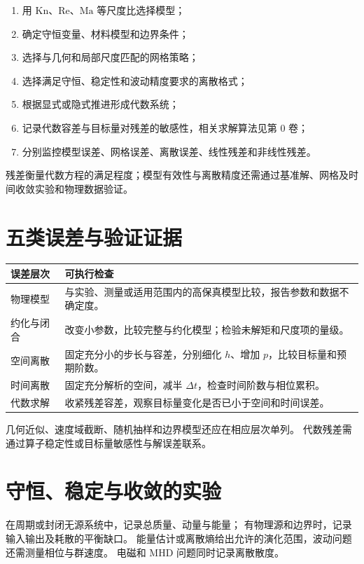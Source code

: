 \begin{enumerate}
  \item 用 \(\mathrm{Kn}\)、\(\mathrm{Re}\)、\(\mathrm{Ma}\) 等尺度比选择模型；
  \item 确定守恒变量、材料模型和边界条件；
  \item 选择与几何和局部尺度匹配的网格策略；
  \item 选择满足守恒、稳定性和波动精度要求的离散格式；
  \item 根据显式或隐式推进形成代数系统；
  \item 记录代数容差与目标量对残差的敏感性，相关求解算法见第 0 卷；
  \item 分别监控模型误差、网格误差、离散误差、线性残差和非线性残差。
\end{enumerate}

残差衡量代数方程的满足程度；模型有效性与离散精度还需通过基准解、网格及时间收敛实验和物理数据验证。

\section{五类误差与验证证据}
\begin{center}\small
\begin{tabularx}{\textwidth}{@{}l>{\raggedright\arraybackslash}X@{}}
\toprule
误差层次 & 可执行检查\\
\midrule
物理模型 & 与实验、测量或适用范围内的高保真模型比较，报告参数和数据不确定度。\\
约化与闭合 & 改变小参数，比较完整与约化模型；检验未解矩和尺度项的量级。\\
空间离散 & 固定充分小的步长与容差，分别细化 $h$、增加 $p$，比较目标量和预期阶数。\\
时间离散 & 固定充分解析的空间，减半 $\Delta t$，检查时间阶数与相位累积。\\
代数求解 & 收紧残差容差，观察目标量变化是否已小于空间和时间误差。\\
\bottomrule
\end{tabularx}
\end{center}
几何近似、速度域截断、随机抽样和边界模型还应在相应层次单列。
代数残差需通过算子稳定性或目标量敏感性与解误差联系。

\section{守恒、稳定与收敛的实验}
在周期或封闭无源系统中，记录总质量、动量与能量；
有物理源和边界时，记录输入输出及耗散的平衡缺口。
能量估计或离散熵给出允许的演化范围，波动问题还需测量相位与群速度。
电磁和 MHD 问题同时记录离散散度。

